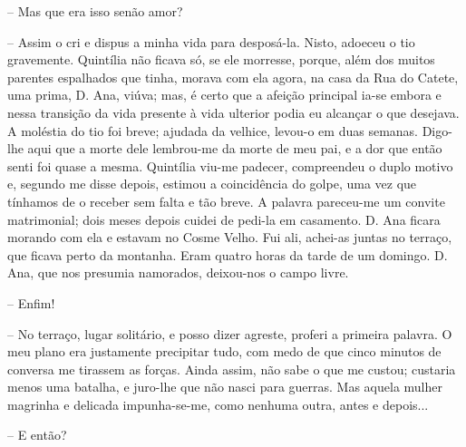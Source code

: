 -- Mas que era isso senão amor?

-- Assim o cri e dispus a minha vida para desposá-la. Nisto, adoeceu o
tio gravemente. Quintília não ficava só, se ele morresse, porque, além
dos muitos parentes espalhados que tinha, morava com ela agora, na casa
da Rua do Catete, uma prima, D. Ana, viúva; mas, é certo que a afeição
principal ia-se embora e nessa transição da vida presente à vida
ulterior podia eu alcançar o que desejava. A moléstia do tio foi breve;
ajudada da velhice, levou-o em duas semanas. Digo-lhe aqui que a morte
dele lembrou-me da morte de meu pai, e a dor que então senti foi quase a
mesma. Quintília viu-me padecer, compreendeu o duplo motivo e, segundo
me disse depois, estimou a coincidência do golpe, uma vez que tínhamos
de o receber sem falta e tão breve. A palavra pareceu-me um convite
matrimonial; dois meses depois cuidei de pedi-la em casamento. D. Ana
ficara morando com ela e estavam no Cosme Velho. Fui ali, achei-as
juntas no terraço, que ficava perto da montanha. Eram quatro horas da
tarde de um domingo. D. Ana, que nos presumia namorados, deixou-nos o
campo livre.

-- Enfim!

-- No terraço, lugar solitário, e posso dizer agreste, proferi a
primeira palavra. O meu plano era justamente precipitar tudo, com medo
de que cinco minutos de conversa me tirassem as forças. Ainda assim, não
sabe o que me custou; custaria menos uma batalha, e juro-lhe que não
nasci para guerras. Mas aquela mulher magrinha e delicada impunha-se-me,
como nenhuma outra, antes e depois...

-- E então?


